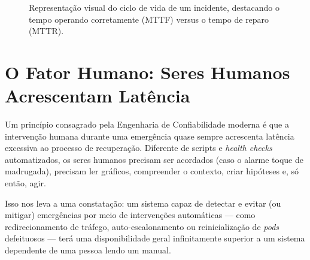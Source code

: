 \documentclass[12pt,a4paper]{report}
\begin{document}
\begin{figure}[h]
    \centering
    \caption{Representação visual do ciclo de vida de um incidente, destacando o tempo operando corretamente (MTTF) versus o tempo de reparo (MTTR).}
\end{figure}

\section{O Fator Humano: Seres Humanos Acrescentam Latência}

Um princípio consagrado pela Engenharia de Confiabilidade moderna é que a intervenção humana durante uma emergência quase sempre acrescenta latência excessiva ao processo de recuperação. Diferente de scripts e \textit{health checks} automatizados, os seres humanos precisam ser acordados (caso o alarme toque de madrugada), precisam ler gráficos, compreender o contexto, criar hipóteses e, só então, agir.

Isso nos leva a uma constatação: um sistema capaz de detectar e evitar (ou mitigar) emergências por meio de intervenções automáticas — como redirecionamento de tráfego, auto-escalonamento ou reinicialização de \textit{pods} defeituosos — terá uma disponibilidade geral infinitamente superior a um sistema dependente de uma pessoa lendo um manual.
\end{document}
